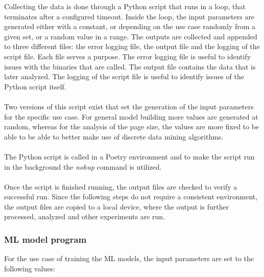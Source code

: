 Collecting the data is done through a Python script that runs in a loop, that terminates after a configured timeout. Inside the loop, the input parameters are generated either with a constant, or depending on the use case randomly from a given set, or a random value in a range. The outputs are collected and appended to three different files: the error logging file, the output file and the logging of the script file. Each file serves a purpose. The error logging file is useful to identify issues with the binaries that are called. The output file contains the data that is later analyzed. The logging of the script file is useful to identify issues of the Python script itself. \\ \\
Two versions of this script exist that set the generation of the input parameters for the specific use case. For general model building more values are generated at random, whereas for the analysis of the page size, the values are more fixed to be able to be able to better make use of discrete data mining algorithms.\\ \\
The Python script is called in a Poetry \parencite{poetry:online} environment and to make the script run in the background the \textit{nohup} \parencite{nohup1Li95:online} command is utilized.\\ \\
Once the script is finished running, the output files are checked to verify a successful run. Since the following steps do not require a consistent environment, the output files are copied to a local device, where the output is further processed, analyzed and other experiments are run.

\subsubsection{ML model program}
For the use case of training the \ac{ML} models, the input parameters are set to the following values:

